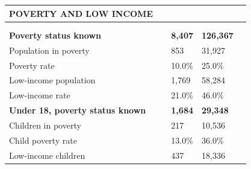 \documentclass[9pt]{report}
\begin{document}
\vspace{12pt}
\setlength{\tabcolsep}{.01in} %
\begin{tabular}{p{.10in}p{.10in}p{.10in}p{3.7in}>{\hfill}p{.85in}>{\hfill}p{.85in}>{\hfill}p{.85in}>{\hfill}p{.85in}p{0.1in}}
\multicolumn{9}{l}{\parbox{7.1in}{\raggedright{\large{\strut\textbf{POVERTY AND LOW INCOME}\strut}}}} \\ 
\hline
\multicolumn{4}{l}{\parbox{3.5in}{\raggedright{\textbf{}}}} & \multicolumn{1}{r}{\parbox{.85in}{\strut\raggedleft{\textbf{}\strut}}} & \multicolumn{1}{r}{\parbox{.85in}{\strut\raggedleft{\textbf{}\strut}}} & \multicolumn{1}{r}{\parbox{.85in}{\strut{}}} & \multicolumn{1}{r}{\parbox{.85in}{\strut{}}} & \\ 
\multicolumn{9}{l}{} \\ 
\multicolumn{4}{l}{\parbox{3.5in}{\strut\raggedright{\textbf{Poverty status known}\strut}}} & \textbf{} & \textbf{} & \textbf{8,407} & \textbf{126,367} & \textbf{} \\ 
\multicolumn{4}{l}{\parbox{3.6in}{\strut\raggedright{{Population in poverty}}\strut}} &  &  & 853 & 31,927 & \multicolumn{1}{l}{}  \\ 
\multicolumn{4}{l}{\parbox{3.6in}{\strut\raggedright{{Poverty rate}}\strut}} &  &  & 10.0\% & 25.0\% & \multicolumn{1}{l}{}  \\ 
\multicolumn{4}{l}{\parbox{3.6in}{\strut\raggedright{{Low-income population}}\strut}} &  &  & 1,769 & 58,284 & \multicolumn{1}{l}{}  \\ 
\multicolumn{4}{l}{\parbox{3.6in}{\strut\raggedright{{Low-income rate}}\strut}} &  &  & 21.0\% & 46.0\% & \multicolumn{1}{l}{}  \\ 
\multicolumn{4}{l}{\parbox{3.5in}{\strut\raggedright{\textbf{Under 18, poverty status known}\strut}}} & \textbf{} & \textbf{} & \textbf{1,684} & \textbf{29,348} & \textbf{} \\ 
\multicolumn{4}{l}{\parbox{3.6in}{\strut\raggedright{{Children in poverty}}\strut}} &  &  & 217 & 10,536 & \multicolumn{1}{l}{}  \\ 
\multicolumn{4}{l}{\parbox{3.6in}{\strut\raggedright{{Child poverty rate}}\strut}} &  &  & 13.0\% & 36.0\% & \multicolumn{1}{l}{}  \\ 
\multicolumn{4}{l}{\parbox{3.6in}{\strut\raggedright{{Low-income children}}\strut}} &  &  & 437 & 18,336 & \multicolumn{1}{l}{}  \\ 

\end{tabular}
\end{document}
